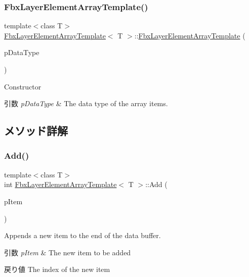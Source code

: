 \subsubsection{\texorpdfstring{Fbx\+Layer\+Element\+Array\+Template()}{FbxLayerElementArrayTemplate()}}
{\footnotesize\ttfamily template$<$class T$>$ \\
\hyperlink{class_fbx_layer_element_array_template}{Fbx\+Layer\+Element\+Array\+Template}$<$ T $>$\+::\hyperlink{class_fbx_layer_element_array_template}{Fbx\+Layer\+Element\+Array\+Template} (\begin{DoxyParamCaption}\item[{\hyperlink{fbxpropertytypes_8h_a73913a5ddfb20e57c6f25e9e6784bd92}{E\+Fbx\+Type}}]{p\+Data\+Type }\end{DoxyParamCaption})}

Constructor 
\begin{DoxyParams}{引数}
{\em p\+Data\+Type} & The data type of the array items. \\
\hline
\end{DoxyParams}


\subsection{メソッド詳解}
\mbox{\label{class_fbx_layer_element_array_template_acc403e924944fe9921dac121156bf963}} 
\subsubsection{\texorpdfstring{Add()}{Add()}}
{\footnotesize\ttfamily template$<$class T$>$ \\
int \hyperlink{class_fbx_layer_element_array_template}{Fbx\+Layer\+Element\+Array\+Template}$<$ T $>$\+::Add (\begin{DoxyParamCaption}\item[{T const \&}]{p\+Item }\end{DoxyParamCaption})}

Appends a new item to the end of the data buffer. 
\begin{DoxyParams}{引数}
{\em p\+Item} & The new item to be added \\
\hline
\end{DoxyParams}
\begin{DoxyReturn}{戻り値}
The index of the new item 
\end{DoxyReturn}
\mbox{\label{class_fbx_layer_element_array_template_a60e464ae7d193fa397d2099c760482d6}} 
